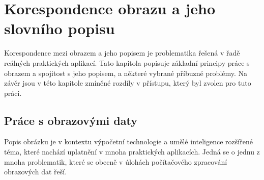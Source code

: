 \clearpage
\section{Korespondence obrazu a jeho slovního popisu}
Korespondence mezi obrazem a jeho popisem je problematika řešená v řadě reálných praktických aplikací.
Tato kapitola popisuje základní principy práce s obrazem a spojitost s jeho popisem, a některé vybrané příbuzné problémy.
Na závěr jsou v této kapitole zmíněné rozdíly v přístupu, který byl zvolen pro tuto práci.

\subsection{Práce s obrazovými daty}
Popis obrázku je v kontextu výpočetní technologie a umělé inteligence rozšířené téma, které nachází uplatnění v mnoha praktických aplikacích.
Jedná se o jednu z mnoha problematik, které se obecně v úlohách počítačového zpracování obrazových dat řeší.

